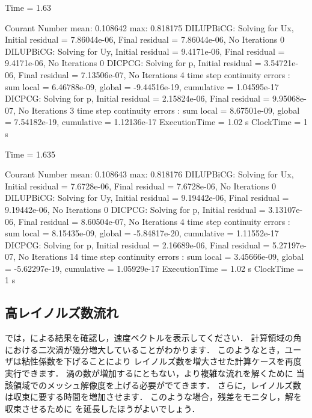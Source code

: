 \begin{OFverbatim}

Time = 1.63

Courant Number mean: 0.108642 max: 0.818175
DILUPBiCG:  Solving for Ux, Initial residual = 7.86044e-06, Final residual = 7.86044e-06,
No Iterations 0
DILUPBiCG:  Solving for Uy, Initial residual = 9.4171e-06, Final residual = 9.4171e-06,
No Iterations 0
DICPCG:  Solving for p, Initial residual = 3.54721e-06, Final residual = 7.13506e-07,
No Iterations 4
time step continuity errors : sum local = 6.46788e-09, global = -9.44516e-19,
cumulative = 1.04595e-17
DICPCG:  Solving for p, Initial residual = 2.15824e-06, Final residual = 9.95068e-07,
No Iterations 3
time step continuity errors : sum local = 8.67501e-09, global = 7.54182e-19,
cumulative = 1.12136e-17
ExecutionTime = 1.02 s  ClockTime = 1 s

Time = 1.635

Courant Number mean: 0.108643 max: 0.818176
DILUPBiCG:  Solving for Ux, Initial residual = 7.6728e-06, Final residual = 7.6728e-06,
No Iterations 0
DILUPBiCG:  Solving for Uy, Initial residual = 9.19442e-06, Final residual = 9.19442e-06,
No Iterations 0
DICPCG:  Solving for p, Initial residual = 3.13107e-06, Final residual = 8.60504e-07,
No Iterations 4
time step continuity errors : sum local = 8.15435e-09, global = -5.84817e-20,
cumulative = 1.11552e-17
DICPCG:  Solving for p, Initial residual = 2.16689e-06, Final residual = 5.27197e-07,
No Iterations 14
time step continuity errors : sum local = 3.45666e-09, global = -5.62297e-19,
cumulative = 1.05929e-17
ExecutionTime = 1.02 s  ClockTime = 1 s
\end{OFverbatim}


\subsection{高レイノルズ数流れ}
\label{ssec:2.1.8}
では，による結果を確認し，速度ベクトルを表示してください．
計算領域の角における二次渦が幾分増大していることがわかります．
このようなとき，ユーザは粘性係数を下げることにより
レイノルズ数を増大させた計算ケースを再度実行できます．
渦の数が増加するにともない，より複雑な流れを解くために
当該領域でのメッシュ解像度を上げる必要がでてきます．
さらに，レイノルズ数は収束に要する時間を増加させます．
このような場合，残差をモニタし，解を収束させるために
を延長したほうがよいでしょう．


